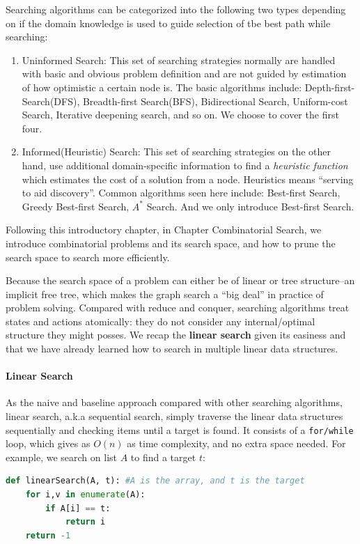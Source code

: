 \documentclass[../main.tex]{subfiles}
\begin{document}
Searching algorithms can be categorized into the following two types depending on if the domain knowledge is used to guide selection of tbe best path while searching:
\begin{enumerate}
    \item Uninformed Search: This set of searching strategies  normally are handled with basic and obvious problem definition and are not guided by estimation of how optimistic a certain node is. The basic algorithms include: Depth-first-Search(DFS), Breadth-first Search(BFS),  Bidirectional Search, Uniform-cost Search, Iterative deepening search, and so on. We choose to cover the first four. 
    \item Informed(Heuristic) Search: This set of searching strategies on the other hand, use additional domain-specific information to find a \textit{heuristic function} which estimates the cost of a solution from a node. Heuristics means ``serving to aid discovery''. Common algorithms seen here include: Best-first Search, Greedy Best-first Search, $A^{*}$ Search. And we only introduce Best-first Search. 
\end{enumerate}


Following this introductory chapter, in {Chapter Combinatorial Search}, we introduce combinatorial problems and its search space, and how to prune the search space to search more efficiently. 

Because the search space of a problem can either be of linear or tree structure--an implicit free tree, which makes the graph search a ``big deal'' in practice of problem solving. Compared with reduce and conquer, searching algorithms treat states and actions atomically: they do not consider any internal/optimal structure they might posses. We recap the \textbf{linear search} given its easiness and that we have already learned how to search in multiple linear data structures. 

\paragraph{Linear Search} As the naive and baseline approach compared with other searching algorithms, linear search, a.k.a sequential search, simply traverse the linear data structures sequentially and checking items until a target is found. It consists of a \texttt{for/while} loop, which gives as $O(n)$ as time complexity, and no extra space needed. For example, we search on list $A$ to find a target $t$:
\begin{lstlisting}[language=Python]
def linearSearch(A, t): #A is the array, and t is the target
    for i,v in enumerate(A):
        if A[i] == t:
            return i
    return -1
\end{lstlisting}
\end{document}
